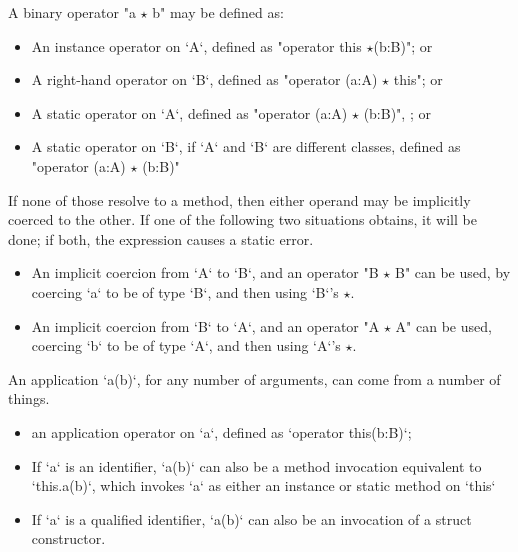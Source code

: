 A binary operator \xcdmath"a $\star$ b" may be defined as: 
\begin{itemize}
\item An instance operator on \xcd`A`, defined as 
      \xcdmath"operator this $\star$(b:B)";
or
\item A right-hand operator on \xcd`B`, defined as
      \xcdmath"operator (a:A) $\star$ this"; or

\item A static operator on \xcd`A`, defined as
      \xcdmath"operator (a:A) $\star$ (b:B)", 
; or
\item A static operator on \xcd`B`, if \xcd`A` and \xcd`B` are different
      classes, defined as
      \xcdmath"operator (a:A) $\star$ (b:B)"
\end{itemize}
\noindent
If none of those resolve to a method, then either operand may be implicitly
coerced to the
other.  If one of the following two situations obtains, it will be done; if
both, the expression causes a static error.
\begin{itemize}
\item An implicit coercion from \xcd`A` to \xcd`B`, and 
      an operator \xcdmath"B $\star$ B" can be used, by 
      coercing \xcd`a` to be of type \xcd`B`, and then using \xcd`B`'s
      $\star$.  
\item An implicit coercion from \xcd`B` to \xcd`A`, and 
      an operator \xcdmath"A $\star$ A" can be used,
      coercing \xcd`b` to be of type \xcd`A`, and then using \xcd`A`'s
      $\star$.  
\end{itemize}

An application \xcd`a(b)`, for any number of arguments, can come from a number
of things. 
\begin{itemize}
\item an application operator on \xcd`a`, defined as \xcd`operator this(b:B)`;
\item If \xcd`a` is an identifier, \xcd`a(b)` can also be a method invocation
      equivalent to \xcd`this.a(b)`, which  invokes \xcd`a` as
      either an instance or static method on \xcd`this`
\item If \xcd`a` is a qualified identifier, \xcd`a(b)` can also be an
      invocation of a struct constructor.
\end{itemize}


